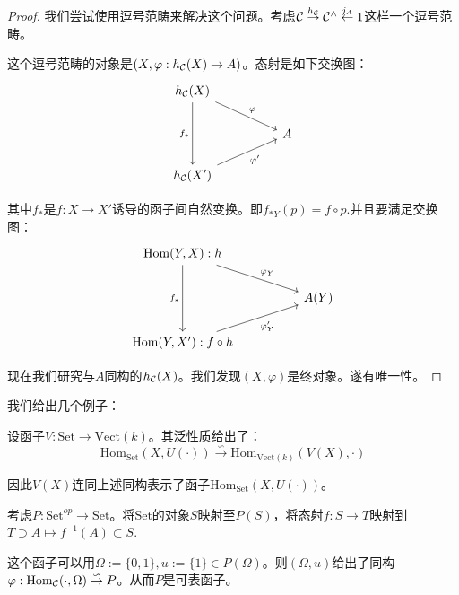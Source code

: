     \begin{proof}
        我们尝试使用逗号范畴来解决这个问题。考虑$\mathcal{C} \overset{h_{\mathcal{C}}}{\to} \mathcal{C}^{\wedge} \overset{j_A}{\leftarrow} 1$这样一个逗号范畴。

        这个逗号范畴的对象是$(X,\varphi:h_{\mathcal{C}}(X) \to A)$。态射是如下交换图：
        \[
            \centering
            \begin{tikzcd}
                {h_{\mathcal{C}}(X)} \\
                && A \\
                {h_{\mathcal{C}}(X')}
                \arrow["{f_*}"', from=1-1, to=3-1]
                \arrow["\varphi", from=1-1, to=2-3]
                \arrow["{\varphi'}"', from=3-1, to=2-3]
            \end{tikzcd}
        \]
        
        其中$f_*$是$f:X \to X'$诱导的函子间自然变换。即${f_*}_{Y}(p)=f\circ p$.并且要满足交换图：
        \[
            \centering
            \begin{tikzcd}
                {\mathrm{Hom}(Y,X):h} \\
                && {A(Y)} \\
                {\mathrm{Hom}(Y,X'):f\circ h}
                \arrow["{f_*}"', from=1-1, to=3-1]
                \arrow["{\varphi_Y}", from=1-1, to=2-3]
                \arrow["{\varphi'_Y}"', from=3-1, to=2-3]
            \end{tikzcd}
        \]

        现在我们研究与$A$同构的$h_{\mathcal{C}}(X)$。我们发现$(X,\varphi)$是终对象。遂有唯一性。
    \end{proof}
    
    我们给出几个例子：
    \begin{example}{}
        设函子$V:\mathrm{Set} \to \mathrm{Vect}(k)$。其泛性质给出了：
        $$
        \mathrm{Hom}_{\mathrm{Set}}(X,U(\cdot)) \overset{\backsim}{\to} \mathrm{Hom}_{\mathrm{Vect}(k)}(V(X),\cdot)
        $$

        因此$V(X)$连同上述同构表示了函子$\mathrm{Hom}_{\mathrm{Set}}(X,U(\cdot))$。
    \end{example}
    \begin{example}{}
        考虑$P:\mathrm{Set}^{op} \to \mathrm{Set}$。将$\mathrm{Set}$的对象$S$映射至$P(S)$，将态射$f:S \to T$映射到$T \supset A \mapsto f^{-1}(A) \subset S$.

        这个函子可以用$\Omega:=\{0,1\},u:=\{1\} \in P(\Omega)$。则$(\Omega,u)$给出了同构$\varphi:\mathrm{Hom}_{\mathcal{C}}(\cdot,\Omega) \overset{\backsim}{\to}P$。从而$P$是可表函子。
    \end{example}
